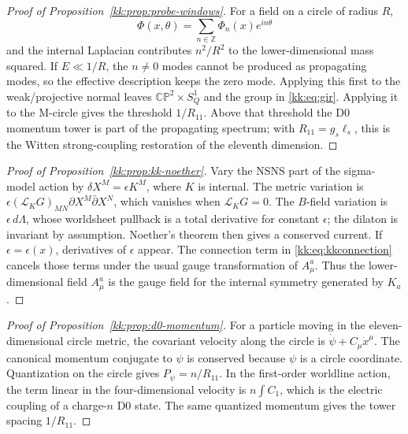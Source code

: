 \documentclass[11pt]{article}
\newcommand{\CP}{\mathbb{CP}}
\newcommand{\ZZ}{\mathbb{Z}}
\newcommand{\Lie}{\mathcal{L}}
\theoremstyle{plain}
\theoremstyle{definition}
\begin{document}
\begin{proof}[Proof of Proposition~\ref{kk:prop:probe-windows}]
For a field on a circle of radius \(R\),
\[
  \Phi(x,\theta)=\sum_{n\in\ZZ}\Phi_n(x)e^{in\theta}
\]
and the internal Laplacian contributes \(n^2/R^2\) to the lower-dimensional
mass squared.  If \(E\ll 1/R\), the \(n\ne0\) modes cannot be produced as
propagating modes, so the effective description keeps the zero mode.  Applying
this first to the weak/projective normal leaves \(\CP^2\times S^1_Q\) and the
group in \eqref{kk:eq:gir}.  Applying it to the M-circle gives the threshold
\(1/R_{11}\).  Above that threshold the D0 momentum tower is part of the
propagating spectrum; with \(R_{11}=g_s\ell_s\), this is the Witten
strong-coupling restoration of the eleventh dimension.
\end{proof}

\begin{proof}[Proof of Proposition~\ref{kk:prop:kk-noether}]
Vary the NSNS part of the sigma-model action by
\(\delta X^M=\epsilon K^M\), where \(K\) is internal.  The metric variation is
\(\epsilon(\Lie_KG)_{MN}\partial X^M\bar\partial X^N\), which vanishes when
\(\Lie_KG=0\).  The \(B\)-field variation is \(\epsilon\,d\Lambda\), whose
worldsheet pullback is a total derivative for constant \(\epsilon\); the
dilaton is invariant by assumption.  Noether's theorem then gives a conserved
current.  If \(\epsilon=\epsilon(x)\), derivatives of \(\epsilon\) appear.  The
connection term in \eqref{kk:eq:kkconnection} cancels those terms under the usual
gauge transformation of \(A_\mu^a\).  Thus the lower-dimensional field
\(A_\mu^a\) is the gauge field for the internal symmetry generated by \(K_a\).
\end{proof}

\begin{proof}[Proof of Proposition~\ref{kk:prop:d0-momentum}]
For a particle moving in the eleven-dimensional circle metric, the covariant
velocity along the circle is \(\dot\psi+C_\mu\dot x^\mu\).  The canonical
momentum conjugate to \(\psi\) is conserved because \(\psi\) is a circle
coordinate.  Quantization on the circle gives \(P_\psi=n/R_{11}\).  In the
first-order worldline action, the term linear in the four-dimensional velocity
is \(n\int C_1\), which is the electric coupling of a charge-\(n\) D0 state.
The same quantized momentum gives the tower spacing \(1/R_{11}\).
\end{proof}
\end{document}
